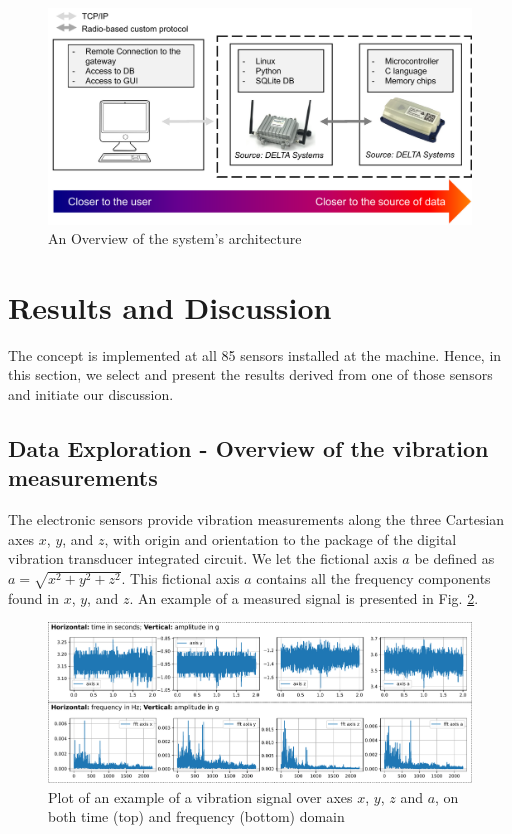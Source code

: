 \documentclass[conference]{IEEEtran}
\begin{document}
\begin{figure}[htbp]
\centerline{\includegraphics[width=\columnwidth]{graphics/concept/concept_pre_new.pdf}}
\caption{An Overview of the system's architecture}
\label{concept_pre}
\end{figure}

\section{Results and Discussion}
The concept is implemented at all 85 sensors installed at the machine. Hence, in this section, we select and present the results derived from one of those sensors and initiate our discussion. 
\label{sec_results_discussion}
\subsection{Data Exploration - Overview of the vibration measurements}

The electronic sensors provide vibration measurements along the three Cartesian axes $x$, $y$, and $z$, with origin and orientation to the package of the digital vibration transducer integrated circuit. We let the fictional axis $a$ be defined as $a = \sqrt{x^{2}+y^{2}+z^{2}}$. This fictional axis $a$ contains all the frequency components found in $x$, $y$, and $z$. An example of a measured signal is presented in Fig. \ref{fig_example_signals}.

\begin{figure}[htbp]
\centering
\includegraphics[width=\columnwidth]{graphics/axes_time_fft/axes_time_fft.pdf}
\caption{Plot of an example of a vibration signal over axes $x$, $y$, $z$ and $a$, on both time (top) and frequency (bottom) domain}
\label{fig_example_signals}
\end{figure}
\end{document}

